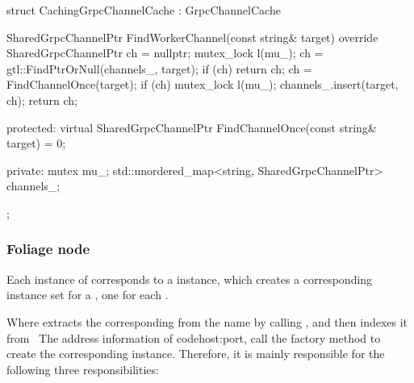 \begin{content}
\begin{leftbar}
\begin{c++}
struct CachingGrpcChannelCache : GrpcChannelCache {
  SharedGrpcChannelPtr FindWorkerChannel(const string& target) override {
    SharedGrpcChannelPtr ch = nullptr;
    {
      mutex_lock l(mu_);
      ch = gtl::FindPtrOrNull(channels_, target);
      if (ch) {
        return ch;
      }
    }
    ch = FindChannelOnce(target);
    if (ch) {
      mutex_lock l(mu_);
      channels_.insert({target, ch});
    }
    return ch;
  }

 protected:
  virtual SharedGrpcChannelPtr FindChannelOnce(const string& target) = 0;

 private:
  mutex mu_;
  std::unordered_map<string, SharedGrpcChannelPtr> channels_;
};
\end{c++}
\end{leftbar}

\subsubsection{Foliage node}

Each instance of  corresponds to a  instance, which creates a corresponding  instance set for a , one for each  .

Where  extracts the corresponding  from the  name by calling , and then indexes it from \ The address information of code{host:port}, call the factory method  to create the corresponding  instance. Therefore, it is mainly responsible for the following three responsibilities:

\begin{enum}
\end{enum}


\end{content}
